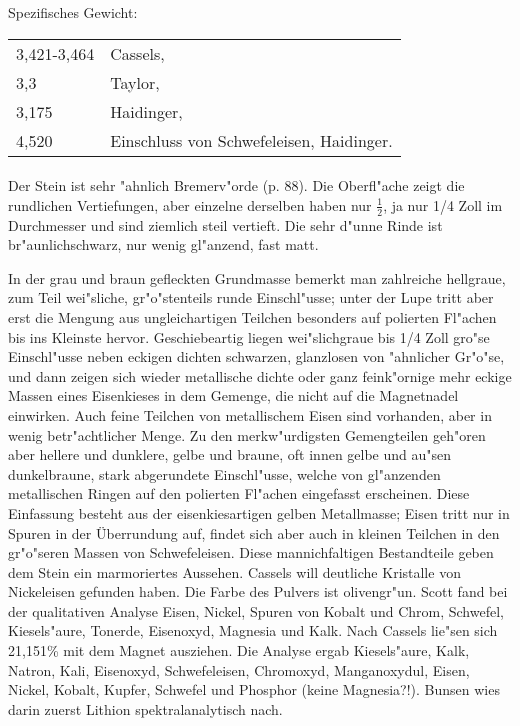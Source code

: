 \documentclass[a4paper, 11pt, oneside]{article}
\begin{document}
Spezifisches Gewicht:  
\begin{table}[!ht]
    \centering
    \begin{tabular}{l l}
        3,421-3,464 & Cassels,\\
        3,3 & Taylor,\\
        3,175 & Haidinger,\\
        4,520 & Einschluss von Schwefeleisen, Haidinger.
    \end{tabular}
\end{table}
\paragraph{}
Der Stein ist sehr "ahnlich Bremerv"orde (p. 88). Die Oberfl"ache zeigt die rundlichen Vertiefungen, aber einzelne derselben haben nur $\frac{1}{2}$, ja nur 1/4 Zoll im Durchmesser und sind ziemlich steil vertieft. Die sehr d"unne Rinde ist br"aunlichschwarz, nur wenig gl"anzend, fast matt.

In der grau und braun gefleckten Grundmasse bemerkt man zahlreiche hellgraue, zum Teil wei"sliche, gr"o"stenteils runde Einschl"usse; unter der Lupe tritt aber erst die Mengung aus ungleichartigen Teilchen besonders auf polierten Fl"achen bis ins Kleinste hervor. Geschiebeartig liegen wei"slichgraue bis 1/4 Zoll gro"se Einschl"usse neben eckigen dichten schwarzen, glanzlosen von "ahnlicher Gr"o"se, und dann zeigen sich wieder metallische dichte oder ganz feink"ornige mehr eckige Massen eines Eisenkieses in dem Gemenge, die nicht auf die Magnetnadel einwirken. Auch feine Teilchen von metallischem Eisen sind vorhanden, aber in wenig betr"achtlicher Menge. Zu den merkw"urdigsten Gemengteilen geh"oren aber hellere und dunklere, gelbe und braune, oft innen gelbe und au"sen dunkelbraune, stark abgerundete Einschl"usse, welche von gl"anzenden metallischen Ringen auf den polierten Fl"achen eingefasst erscheinen. Diese Einfassung besteht aus der eisenkiesartigen gelben Metallmasse; Eisen tritt nur in Spuren in der Überrundung auf, findet sich aber auch in kleinen Teilchen in den gr"o"seren Massen von Schwefeleisen. Diese mannichfaltigen Bestandteile geben dem Stein ein marmoriertes Aussehen. Cassels will deutliche Kristalle von Nickeleisen gefunden haben. Die Farbe des Pulvers ist olivengr"un. Scott fand bei der qualitativen Analyse Eisen, Nickel, Spuren von Kobalt und Chrom, Schwefel, Kiesels"aure, Tonerde, Eisenoxyd, Magnesia und Kalk. Nach Cassels lie"sen sich 21,151\% mit dem Magnet ausziehen. Die Analyse ergab Kiesels"aure, Kalk, Natron, Kali, Eisenoxyd, Schwefeleisen, Chromoxyd, Manganoxydul, Eisen, Nickel, Kobalt, Kupfer, Schwefel und Phosphor (keine Magnesia?!). Bunsen wies darin zuerst Lithion spektralanalytisch nach.
\end{document}
